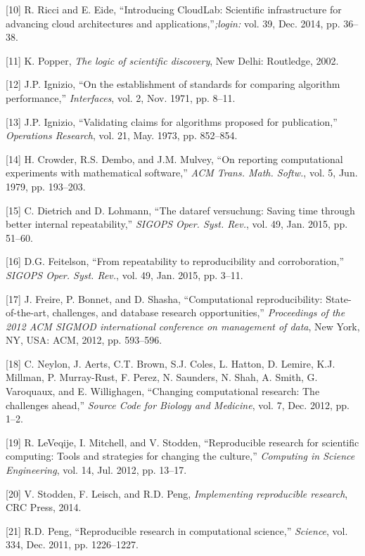 \documentclass[10pt,reprint]{sigplanconf}
\begin{document}
{[}10{]} R. Ricci and E. Eide, ``Introducing CloudLab: Scientific
infrastructure for advancing cloud architectures and
applications,''\emph{;login:} vol. 39, Dec. 2014, pp. 36--38.

{[}11{]} K. Popper, \emph{The logic of scientific discovery}, New Delhi:
Routledge, 2002.

{[}12{]} J.P. Ignizio, ``On the establishment of standards for comparing
algorithm performance,'' \emph{Interfaces}, vol. 2, Nov. 1971, pp.
8--11.

{[}13{]} J.P. Ignizio, ``Validating claims for algorithms proposed for
publication,'' \emph{Operations Research}, vol. 21, May. 1973, pp.
852--854.

{[}14{]} H. Crowder, R.S. Dembo, and J.M. Mulvey, ``On reporting
computational experiments with mathematical software,'' \emph{ACM Trans.
Math. Softw.}, vol. 5, Jun. 1979, pp. 193--203.

{[}15{]} C. Dietrich and D. Lohmann, ``The dataref versuchung: Saving
time through better internal repeatability,'' \emph{SIGOPS Oper. Syst.
Rev.}, vol. 49, Jan. 2015, pp. 51--60.

{[}16{]} D.G. Feitelson, ``From repeatability to reproducibility and
corroboration,'' \emph{SIGOPS Oper. Syst. Rev.}, vol. 49, Jan. 2015, pp.
3--11.

{[}17{]} J. Freire, P. Bonnet, and D. Shasha, ``Computational
reproducibility: State-of-the-art, challenges, and database research
opportunities,'' \emph{Proceedings of the 2012 ACM SIGMOD international
conference on management of data}, New York, NY, USA: ACM, 2012, pp.
593--596.

{[}18{]} C. Neylon, J. Aerts, C.T. Brown, S.J. Coles, L. Hatton, D.
Lemire, K.J. Millman, P. Murray-Rust, F. Perez, N. Saunders, N. Shah, A.
Smith, G. Varoquaux, and E. Willighagen, ``Changing computational
research: The challenges ahead,'' \emph{Source Code for Biology and
Medicine}, vol. 7, Dec. 2012, pp. 1--2.

{[}19{]} R. LeVeqije, I. Mitchell, and V. Stodden, ``Reproducible
research for scientific computing: Tools and strategies for changing the
culture,'' \emph{Computing in Science Engineering}, vol. 14, Jul. 2012,
pp. 13--17.

{[}20{]} V. Stodden, F. Leisch, and R.D. Peng, \emph{Implementing
reproducible research}, CRC Press, 2014.

{[}21{]} R.D. Peng, ``Reproducible research in computational science,''
\emph{Science}, vol. 334, Dec. 2011, pp. 1226--1227.
\end{document}

